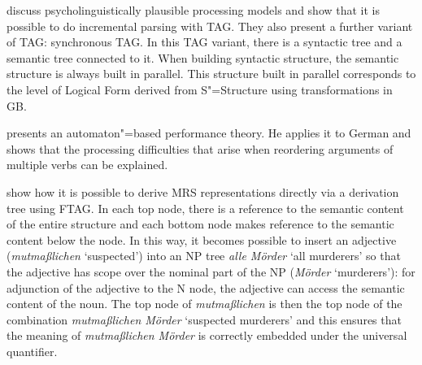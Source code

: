 \citet{SJ93a} discuss psycholinguistically plausible processing models and show that it is possible to do incremental parsing with TAG. They also present a
further variant of TAG: synchronous TAG\indexstag. In this TAG variant, there is a syntactic tree and a semantic tree connected to it.
When building syntactic structure, the semantic structure is always built in parallel. This structure built in parallel corresponds to the level of Logical
Form derived from S"=Structure using transformations in GB.


\citet[Chapter~6]{Rambow94a} presents an automaton"=based performance theory. He applies it to German and shows that
the processing difficulties that arise when reordering arguments of multiple verbs can be explained.

\citet{KR2008a-u} show how it is possible to derive MRS representations directly via a derivation tree using FTAG. In each top node, there is a reference
to the semantic content of the entire structure and each bottom node makes reference to the semantic content below the node. In this way, it becomes possible
to insert an adjective (\eg \emph{mutmaßlichen} `suspected') into an NP tree \emph{alle Mörder} `all murderers' so that the adjective has scope over
the nominal part of the NP (\emph{Mörder} `murderers'): for adjunction of the adjective to the N node, the adjective can access the semantic content of the noun.
The top node of \emph{mutmaßlichen} is then the top node of the combination \emph{mutmaßlichen Mörder} `suspected murderers' and this ensures that the meaning of \emph{mutmaßlichen Mörder}
is correctly embedded under the universal quantifier.


